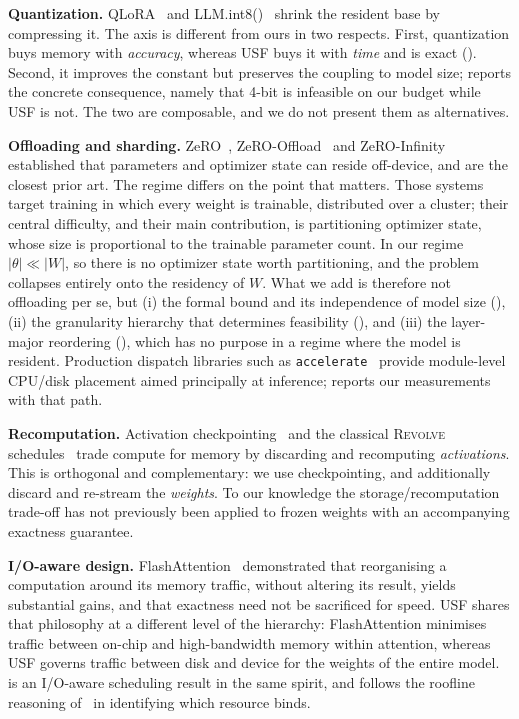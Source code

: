 \documentclass[journal]{IEEEtran}
\newcommand{\usf}{USF}
\begin{document}
\textbf{Quantization.} QLoRA~\cite{dettmers2023qlora} and LLM.int8()~\cite{dettmers2022int8}
shrink the resident base by compressing it. The axis is different from ours in two respects.
First, quantization buys memory with \emph{accuracy}, whereas \usf{} buys it with \emph{time} and
is exact (). Second, it improves the constant but preserves the coupling to
model size;  reports the concrete consequence, namely that 4-bit is infeasible on
our budget while \usf{} is not. The two are composable, and we do not present them as
alternatives.

\textbf{Offloading and sharding.} ZeRO~\cite{rajbhandari2020zero},
ZeRO-Offload~\cite{ren2021zerooffload} and ZeRO-Infinity~\cite{rajbhandari2021zeroinfinity}
established that parameters and optimizer state can reside off-device, and are the closest prior
art. The regime differs on the point that matters. Those systems target training in which every
weight is trainable, distributed over a cluster; their central difficulty, and their main
contribution, is partitioning optimizer state, whose size is proportional to the trainable
parameter count. In our regime $|\theta| \ll |W|$, so there is no optimizer state worth
partitioning, and the problem collapses entirely onto the residency of $W$. What we add is
therefore not offloading per se, but (i) the formal bound and its independence of model size
(), (ii) the granularity hierarchy that determines feasibility
(), and (iii) the layer-major reordering (), which has no purpose in a
regime where the model is resident. Production dispatch libraries such as
\texttt{accelerate}~\cite{accelerate2022} provide module-level CPU/disk placement aimed principally
at inference;  reports our measurements with that path.

\textbf{Recomputation.} Activation checkpointing~\cite{chen2016checkpointing} and the classical
\textsc{Revolve} schedules~\cite{griewank2000revolve} trade compute for memory by discarding and
recomputing \emph{activations}. This is orthogonal and complementary: we use checkpointing, and
additionally discard and re-stream the \emph{weights}. To our knowledge the storage/recomputation
trade-off has not previously been applied to frozen weights with an accompanying exactness
guarantee.

\textbf{I/O-aware design.} FlashAttention~\cite{dao2022flashattention} demonstrated that
reorganising a computation around its memory traffic, without altering its result, yields
substantial gains, and that exactness need not be sacrificed for speed. \usf{} shares
that philosophy at a different level of the hierarchy: FlashAttention minimises traffic between
on-chip and high-bandwidth memory within attention, whereas \usf{} governs traffic between disk and
device for the weights of the entire model.  is an I/O-aware scheduling result in the
same spirit, and  follows the roofline reasoning of~\cite{williams2009roofline} in
identifying which resource binds.
\end{document}
